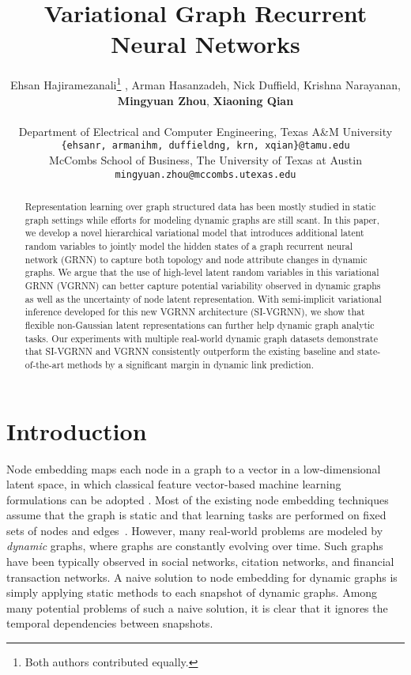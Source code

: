 \documentclass{article}
\title{Variational Graph Recurrent Neural Networks}
\author{Ehsan Hajiramezanali\thanks{Both authors contributed equally.} , Arman Hasanzadeh, Nick Duffield, Krishna Narayanan,\\ 
  {\bf Mingyuan Zhou}, {\bf Xiaoning Qian}
\\
\\
   Department of Electrical and Computer Engineering, Texas A\&M University\\
  \texttt{\{ehsanr, armanihm, duffieldng, krn, xqian\}@tamu.edu}\\
   McCombs School of Business, The University of Texas at Austin\\
  \texttt{mingyuan.zhou@mccombs.utexas.edu}
}
\begin{document}
\maketitle

\begin{abstract}
Representation learning over graph structured data has been mostly studied in static graph settings while efforts 
for modeling dynamic graphs are still scant.
In this paper, we develop a novel hierarchical variational model that introduces additional latent random variables to jointly model the hidden states of a graph recurrent neural network (GRNN) to capture both topology and node attribute changes in dynamic graphs.
We argue that the use of high-level latent random variables in this variational GRNN (VGRNN) can better capture potential variability observed in dynamic graphs as well as  
the uncertainty of node latent representation.
With semi-implicit variational inference developed for this new VGRNN architecture (SI-VGRNN), we show that flexible non-Gaussian latent representations can further help dynamic graph analytic tasks.
Our experiments with multiple real-world dynamic graph datasets demonstrate that SI-VGRNN and VGRNN consistently outperform the existing baseline 
and state-of-the-art methods by a significant margin in dynamic link prediction.
\end{abstract}

\section{Introduction}
Node embedding maps each node in a graph to a vector in a low-dimensional latent space, in which classical feature vector-based machine learning formulations can be adopted \citep{donnat2018}. Most of the existing node embedding techniques assume that the graph is static and that learning tasks are performed on fixed sets of nodes and edges~\citep{perozzi2014deepwalk, tang2015line, grover2016node2vec, ribeiro2017struc2vec,  kipf2016variational, armandpour2019robust}.
However, many real-world problems are modeled by \textit{dynamic} graphs, where graphs are constantly evolving over time. Such graphs have been typically observed in social networks, citation networks, and financial transaction networks. A naive solution to node embedding for dynamic graphs is simply applying static methods to each snapshot of dynamic graphs. Among many potential problems of such a naive solution, it is clear that it ignores the temporal dependencies between snapshots.
\end{document}
